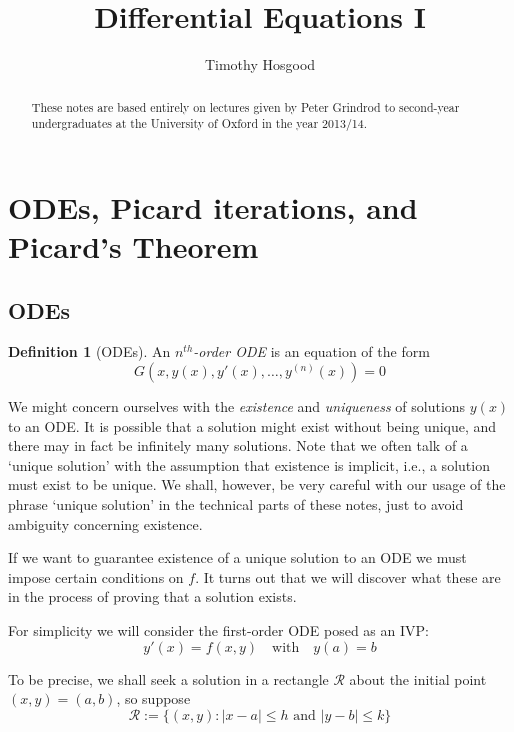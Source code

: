 \documentclass[10pt,fleqn]{article}
\author{Timothy Hosgood}
\title{Differential Equations I}
\newcommand{\rect}{\mathcal{R}}
\theoremstyle{definition} \newtheorem{defn}{Definition}[section]
\theoremstyle{plain}      \newtheorem{thm}[defn]{Theorem}
\theoremstyle{plain}      \newtheorem{lem}[defn]{Lemma}
\theoremstyle{definition} \newtheorem{prop}[defn]{Proposition}
\theoremstyle{definition} \newtheorem{cor}[defn]{Corollary}
\theoremstyle{definition} \newtheorem{ex}[defn]{Example}
\theoremstyle{definition} \newtheorem{rem}[defn]{Remark}
\begin{document}
\maketitle
\begin{abstract}
    These notes are based entirely on lectures given by Peter Grindrod to second-year undergraduates at the University of Oxford in the year 2013/14.
\end{abstract}
\tableofcontents


\section{ODEs, Picard iterations, and Picard's Theorem}

\subsection{ODEs}

\begin{defn}[ODEs]
    An \emph{$n^{th}$-order ODE} is an equation of the form
    \[
        G(x,y(x),y'(x),\ldots,y^{(n)}(x))=0
    \]
\end{defn}

We might concern ourselves with the \emph{existence} and \emph{uniqueness} of solutions $y(x)$ to an ODE.
It is possible that a solution might exist without being unique, and there may in fact be infinitely many solutions.
Note that we often talk of a `unique solution' with the assumption that existence is implicit, i.e., a solution must exist to be unique.
We shall, however, be very careful with our usage of the phrase `unique solution' in the technical parts of these notes, just to avoid ambiguity concerning existence.

If we want to guarantee existence of a unique solution to an ODE we must impose certain conditions on $f$.
It turns out that we will discover what these are in the process of proving that a solution exists.

For simplicity we will consider the first-order ODE posed as an IVP:
\begin{equation}\label{fo-ivp}
    y'(x)=f(x,y)\quad\text{with}\quad y(a)=b
\end{equation}

To be precise, we shall seek a solution in a rectangle $\rect$ about the initial point $(x,y)=(a,b)$, so suppose
\begin{equation}\label{rectangle}
    \rect:=\{(x,y)\colon |x-a|\leq h\text{ and }|y-b|\leq k\}
\end{equation}
\end{document}
